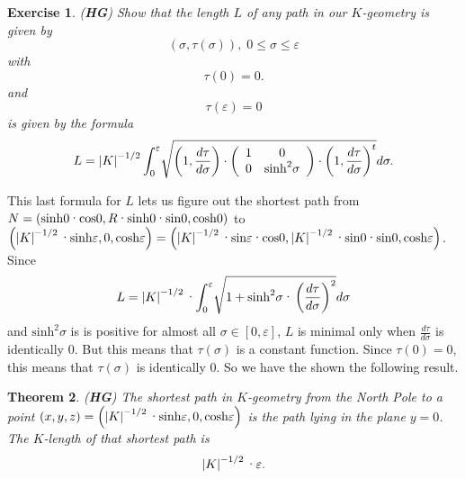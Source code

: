 \documentclass{article}%
\newtheorem{theorem}{Theorem}
\newtheorem{exercise}[theorem]{Exercise}
\begin{document}
\begin{exercise}
(\textbf{HG}) Show that the length $L$ of any path in our $K$-geometry is
given by%
\[
\left(  \sigma,\tau\left(  \sigma\right)  \right)  ,\;0\leq\sigma
\leq\varepsilon
\]
with%
\[
\tau\left(  0\right)  =0.
\]
and%
\[
\tau\left(  \varepsilon\right)  =0
\]
is given by the formula%
\[
L=\left\vert K\right\vert ^{-1/2}%
{\displaystyle\int\nolimits_{0}^{\varepsilon}}
\sqrt{\left(  1,\frac{d\tau}{d\sigma}\right)  \cdot\left(
\begin{array}
[c]{cc}%
1 & 0\\
0 & \mathrm{sinh}^{2}\sigma
\end{array}
\right)  \cdot\left(  1,\frac{d\tau}{d\sigma}\right)  ^{t}}d\sigma.
\]

\end{exercise}

This last formula for $L$ lets us figure out the shortest path from $N=\left(
\mathrm{sinh}0\text{\textperiodcentered}\mathrm{cos}%
0,R\text{\textperiodcentered}\mathrm{sinh}0\text{\textperiodcentered
}\mathrm{sin}0,\mathrm{cosh}0\right)  $ to $\left(  \left\vert K\right\vert
^{-1/2}\text{\textperiodcentered}\mathrm{sinh}\varepsilon,0,\mathrm{cosh}%
\varepsilon\right)  =\left(  \left\vert K\right\vert ^{-1/2}%
\text{\textperiodcentered}\mathrm{sin\varepsilon}\text{\textperiodcentered
}\mathrm{cos}0,\left\vert K\right\vert ^{-1/2}\text{\textperiodcentered
}\mathrm{sin}0\text{\textperiodcentered}\mathrm{sin}0,\mathrm{cosh}%
\varepsilon\right)  $. Since%
\[
L=\left\vert K\right\vert ^{-1/2}\text{\textperiodcentered}%
{\displaystyle\int\nolimits_{0}^{\varepsilon}}
\sqrt{1+\mathrm{sinh}^{2}\sigma\text{\textperiodcentered}\left(  \frac{d\tau
}{d\sigma}\right)  ^{2}}d\sigma
\]
and $\mathrm{sinh}^{2}\sigma$ is is positive for almost all $\sigma\in\left[
0,\varepsilon\right]  $, $L$ is minimal only when $\frac{d\tau}{d\sigma}$ is
identically $0$. But this means that $\tau\left(  \sigma\right)  $ is a
constant function. Since $\tau\left(  0\right)  =0$, this means that
$\tau\left(  \sigma\right)  $ is identically $0$. So we have the shown the
following result.

\begin{theorem}
(\textbf{HG}) The shortest path in $K$-geometry from the North Pole to a point
$\left(  x,y,z\right)  =\left(  \left\vert K\right\vert ^{-1/2}%
\text{\textperiodcentered}\mathrm{sinh}\varepsilon,0,\mathrm{cosh}%
\varepsilon\right)  $ is the path lying in the plane $y=0$. The $K$-length of
that shortest path is%
\[
\left\vert K\right\vert ^{-1/2}\text{\textperiodcentered}\varepsilon.
\]
\pagebreak
\end{theorem}
\end{document}
